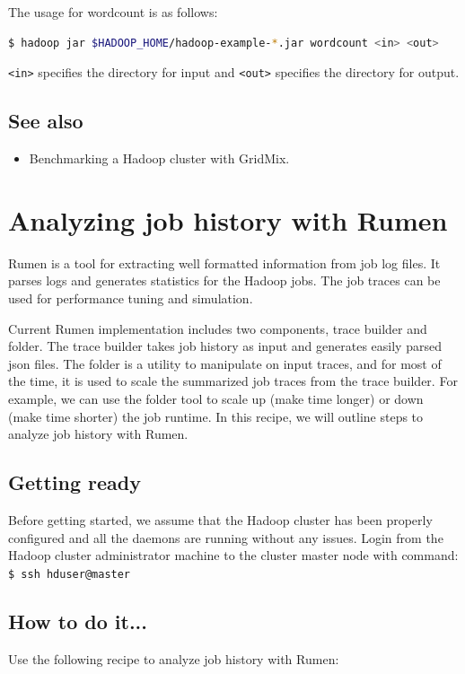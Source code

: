 The usage for wordcount is as follows:
\lstset{style=bashstyle}
\begin{lstlisting}[language=bash]
$ hadoop jar $HADOOP_HOME/hadoop-example-*.jar wordcount <in> <out>
\end{lstlisting}
\verb|<in>| specifies the directory for input and \verb|<out>| specifies the directory for output.

\subsection*{See also}
\begin{itemize}
  \item Benchmarking a Hadoop cluster with GridMix.
\end{itemize}
\section{Analyzing job history with Rumen}
Rumen is a tool for extracting well formatted information from job log files. It parses logs and generates statistics for the Hadoop jobs. The job traces can be used for performance tuning and simulation.

Current Rumen implementation includes two components, trace builder and folder. The trace builder takes job history as input and generates easily parsed json files. The folder is a utility to manipulate on input traces, and for most of the time, it is used to scale the summarized job traces from the trace builder. For example, we can use the folder tool to scale up (make time longer) or down (make time shorter) the job runtime. In this recipe, we will outline steps to analyze job history with Rumen.

\subsection*{Getting ready}
Before getting started, we assume that the Hadoop cluster has been properly configured and all the daemons are running without any issues.
Login from the Hadoop cluster administrator machine to the cluster master node with command: \\
\verb|$ ssh hduser@master|

\subsection*{How to do it...}
Use the following recipe to analyze job history with Rumen:

